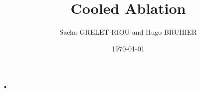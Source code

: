 \documentclass[11pt]{beamer}
\author{Sacha GRELET-RIOU and Hugo BRUHIER}
\title{Cooled Ablation}
\institute{Télécom Saint-Étienne}
\date{\today}
\begin{document}
\begin{frame}
\titlepage
\end{frame}

\begin{frame}
\tableofcontents
\end{frame}

\begin{frame}{•}

\end{frame}
\end{document}
